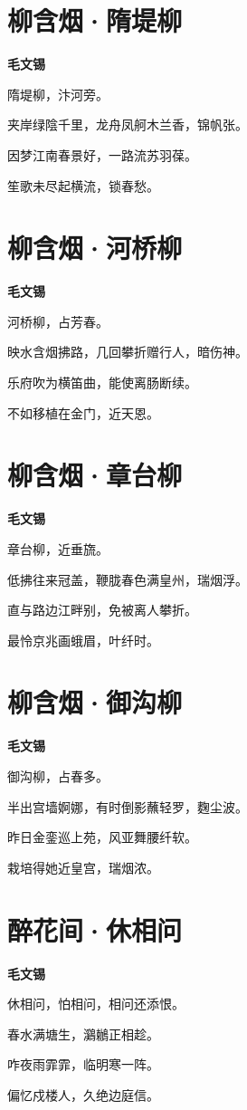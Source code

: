 \documentclass[12pt,a4paper]{ctexbook}
\begin{document}
\section{柳含烟·隋堤柳}
\textbf{毛文锡}\par\vspace{0.5em}
隋堤柳，汴河旁。\par
夹岸绿陰千里，龙舟凤舸木兰香，锦帆张。\par
因梦江南春景好，一路流苏羽葆。\par
笙歌未尽起横流，锁春愁。\par

\section{柳含烟·河桥柳}
\textbf{毛文锡}\par\vspace{0.5em}
河桥柳，占芳春。\par
映水含烟拂路，几回攀折赠行人，暗伤神。\par
乐府吹为横笛曲，能使离肠断续。\par
不如移植在金门，近天恩。\par

\section{柳含烟·章台柳}
\textbf{毛文锡}\par\vspace{0.5em}
章台柳，近垂旒。\par
低拂往来冠盖，鞭胧春色满皇州，瑞烟浮。\par
直与路边江畔别，免被离人攀折。\par
最怜京兆画蛾眉，叶纤时。\par

\section{柳含烟·御沟柳}
\textbf{毛文锡}\par\vspace{0.5em}
御沟柳，占春多。\par
半出宫墙婀娜，有时倒影蘸轻罗，麴尘波。\par
昨日金銮巡上苑，风亚舞腰纤软。\par
栽培得她近皇宫，瑞烟浓。\par

\section{醉花间·休相问}
\textbf{毛文锡}\par\vspace{0.5em}
休相问，怕相问，相问还添恨。\par
春水满塘生，鸂鶒正相趁。\par
咋夜雨霏霏，临明寒一阵。\par
偏忆戍楼人，久绝边庭信。\par
\end{document}
